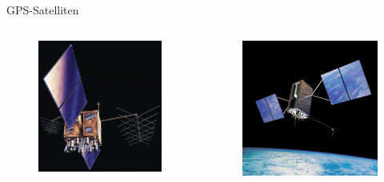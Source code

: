 \begin{frame}{GPS-Satelliten}
    \begin{columns}
        \begin{column}{0.5\textwidth}
            \begin{figure}
                \centering
                \includegraphics[height=0.6\textheight]{images/IIR.jpg}
            \end{figure}
        \end{column}
        \begin{column}{0.5\textwidth}
            \begin{figure}
                \centering
                \includegraphics[height=0.6\textheight]{images/IIIA.jpg}

\end{figure}
\end{column}
\end{columns}
\end{frame}
